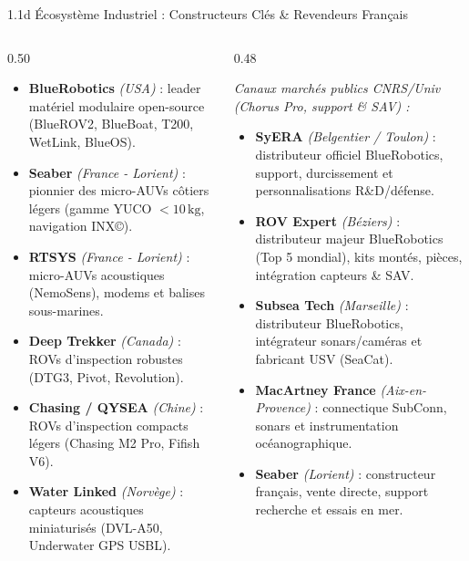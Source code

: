 \begin{frame}{1.1d Écosystème Industriel : Constructeurs Clés \& Revendeurs Français}
  \begin{columns}[T]
    \begin{column}{0.50\textwidth}
      \begin{block}{}
        \scriptsize
        \begin{itemize}
          \item \textbf{BlueRobotics} \textit{(USA)} : leader matériel modulaire open-source (BlueROV2, BlueBoat, T200, WetLink, BlueOS).
          \item \textbf{Seaber} \textit{(France - Lorient)} : pionnier des micro-AUVs côtiers légers (gamme YUCO $<10\,\text{kg}$, navigation INX©).
          \item \textbf{RTSYS} \textit{(France - Lorient)} : micro-AUVs acoustiques (NemoSens), modems et balises sous-marines.
          \item \textbf{Deep Trekker} \textit{(Canada)} : ROVs d'inspection robustes (DTG3, Pivot, Revolution).
          \item \textbf{Chasing / QYSEA} \textit{(Chine)} : ROVs d'inspection compacts légers (Chasing M2 Pro, Fifish V6).
          \item \textbf{Water Linked} \textit{(Norvège)} : capteurs acoustiques miniaturisés (DVL-A50, Underwater GPS USBL).
        \end{itemize}
      \end{block}
    \end{column}

    \begin{column}{0.48\textwidth}
      \begin{block}{}
        \scriptsize
        \textit{Canaux marchés publics CNRS/Univ (Chorus Pro, support \& SAV) :}
        \begin{itemize}
          \item \textbf{SyERA} \textit{(Belgentier / Toulon)} : distributeur officiel BlueRobotics, support, durcissement et personnalisations R\&D/défense.
          \item \textbf{ROV Expert} \textit{(Béziers)} : distributeur majeur BlueRobotics (Top 5 mondial), kits montés, pièces, intégration capteurs \& SAV.
          \item \textbf{Subsea Tech} \textit{(Marseille)} : distributeur BlueRobotics, intégrateur sonars/caméras et fabricant USV (SeaCat).
          \item \textbf{MacArtney France} \textit{(Aix-en-Provence)} : connectique SubConn, sonars et instrumentation océanographique.
          \item \textbf{Seaber} \textit{(Lorient)} : constructeur français, vente directe, support recherche et essais en mer.
        \end{itemize}
      \end{block}
    \end{column}
  \end{columns}
\end{frame}

